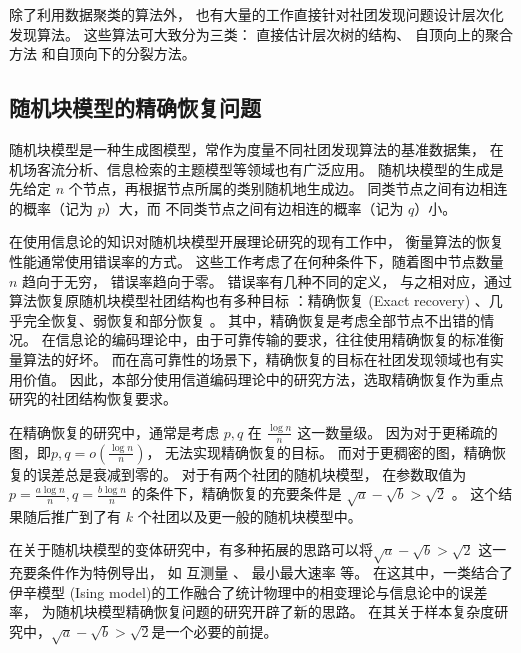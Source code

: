 除了利用数据聚类的算法外，
也有大量的工作直接针对社团发现问题设计层次化发现算法。
这些算法可大致分为三类\cite{li2022hierarchical}：
直接估计层次树的结构\cite{arenas2006synchronization, blundell2013bhcd}、
自顶向上的聚合方法\cite{clauset2004finding}
和自顶向下的分裂方法\cite{girvan2002community, dasgupta2016cost}。

\subsection{随机块模型的精确恢复问题}
随机块模型是一种生成图模型，常作为度量不同社团发现算法的基准数据集，
在机场客流分析\cite{zhao2016rfla}、信息检索的主题模型\cite{Gerlach_2018}等领域也有广泛应用。
随机块模型的生成是先给定 $n$ 个节点，再根据节点所属的类别随机地生成边。
同类节点之间有边相连的概率（记为 $p$）大，而
不同类节点之间有边相连的概率（记为 $q$）小\cite{abbe2017community}。

在使用信息论的知识对随机块模型开展理论研究的现有工作中，
衡量算法的恢复性能通常使用错误率的方式。
这些工作考虑了在何种条件下，随着图中节点数量 $n$ 趋向于无穷，
错误率趋向于零。
错误率有几种不同的定义，
与之相对应，通过算法恢复原随机块模型社团结构也有多种目标
：精确恢复 (Exact recovery) 、几乎完全恢复、弱恢复和部分恢复
\cite{abbe2017community}。
其中，精确恢复是考虑全部节点不出错的情况。
在信息论的编码理论中，由于可靠传输的要求，往往使用精确恢复的标准衡量算法的好坏。
而在高可靠性的场景下，精确恢复的目标在社团发现领域也有实用价值。
因此，本部分使用信道编码理论中的研究方法，选取精确恢复作为重点研究的社团结构恢复要求。


在精确恢复的研究中，通常是考虑 $p, q$ 在 $\frac{\log n}{n}$ 这一数量级。
因为对于更稀疏的图，即$p, q=o\left(\frac{\log n}{n} \right)$，
无法实现精确恢复的目标。
而对于更稠密的图，精确恢复的误差总是衰减到零的。
对于有两个社团的随机块模型，
在参数取值为 $p=\frac{a \log n}{n}, q = \frac{b \log n }{n}$
的条件下，精确恢复的充要条件是
$\sqrt{a} - \sqrt{b} > \sqrt{2}$ \cite{abbe2015exact, mossel2016}。
这个结果随后推广到了有 $k$ 个社团以及更一般的随机块模型中\cite{abbe2015community}。

在关于随机块模型的变体研究中，有多种拓展的思路可以将$\sqrt{a} - \sqrt{b} > \sqrt{2}$
这一充要条件作为特例导出，
如 互测量 \cite{chen2016information}、 最小最大速率 \cite{zhang2016} 等。
在这其中，一类结合了伊辛模型 (Ising model)的工作融合了统计物理中的相变理论与信息论中的误差率\cite{ye2020exact}，
为随机块模型精确恢复问题的研究开辟了新的思路。
在其关于样本复杂度研究中，$\sqrt{a} - \sqrt{b} > \sqrt{2}$是一个必要的前提。


